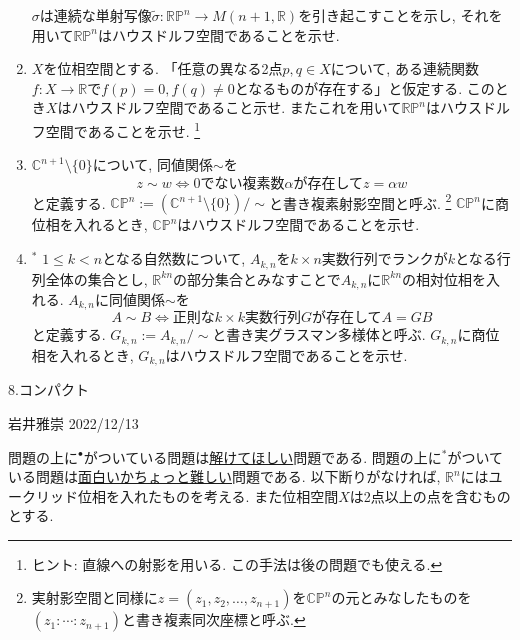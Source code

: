 \documentclass[dvipdfmx,a4paper,11pt]{article}
\newcommand{\R}{\mathbb{R}}
\newcommand{\C}{\mathbb{C}}
\theoremstyle{definition}
\begin{document}
\begin{enumerate}[label=\textbf{問}7.\arabic*]
 $\sigma$は連続な単射写像$\tilde{\sigma} : \R\mathbb{P}^{n} \rightarrow M(n+1, \R)$を引き起こすことを示し, それを用いて$\R\mathbb{P}^{n}$はハウスドルフ空間であることを示せ. 
 
\item $X$を位相空間とする. 「任意の異なる2点$p, q \in X$について, ある連続関数$f : X \rightarrow \R$で$f(p)=0, f(q)\neq 0$となるものが存在する」と仮定する. このとき$X$はハウスドルフ空間であること示せ. またこれを用いて$\R\mathbb{P}^{n}$はハウスドルフ空間であることを示せ. \footnote{ヒント: 直線への射影を用いる. この手法は後の問題でも使える.}
  

\item $\C^{n+1} \setminus \{ 0\}$について, 同値関係$\sim$を
	$$
	z \sim w \Leftrightarrow \text{0でない複素数$\alpha$が存在して$z = \alpha w$}
	$$
	と定義する. $ \C\mathbb{P}^{n}:= (\C^{n+1} \setminus \{ 0\})/\sim$と書き複素射影空間と呼ぶ. \footnote{実射影空間と同様に$z = (z_{1}, z_{2}, \ldots, z_{n+1})$を$\C\mathbb{P}^{n}$の元とみなしたものを$(z_{1}: \cdots : z_{n+1})$と書き複素同次座標と呼ぶ. }
	$\C\mathbb{P}^{n}$に商位相を入れるとき, $\C\mathbb{P}^{n}$はハウスドルフ空間であることを示せ.

\item $^{*}$ $1 \le k < n$となる自然数について, 
$A_{k, n}$を$k \times n$実数行列でランクが$k$となる行列全体の集合とし, $\R^{kn}$の部分集合とみなすことで$A_{k,n}$に$\R^{kn}$の相対位相を入れる. 
$A_{k, n}$に同値関係$\sim$を
$$
	A \sim B \Leftrightarrow \text{正則な$k \times k$実数行列$G$が存在して$A = GB$}
$$
と定義する. $G_{k,n}:= A_{k, n}/\sim$と書き実グラスマン多様体と呼ぶ. $G_{k,n}$に商位相を入れるとき, $G_{k,n}$はハウスドルフ空間であることを示せ. 



 \end{enumerate}
 

\newpage


\begin{center}
{\Large 8.コンパクト}
\end{center}

\begin{flushright}
 岩井雅崇 2022/12/13
\end{flushright}

問題の上に$^{\bullet}$がついている問題は\underline{解けてほしい}問題である. 問題の上に$^{*}$がついている問題は\underline{面白いかちょっと難しい}問題である.  
以下断りがなければ, $\R^{n}$にはユークリッド位相を入れたものを考える. 
また位相空間$X$は2点以上の点を含むものとする.
\end{document}
